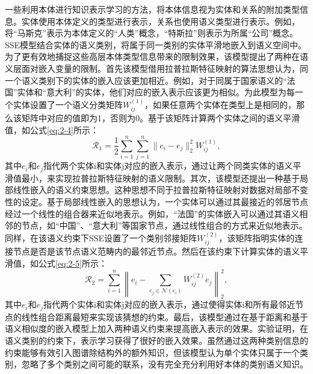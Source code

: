 一些利用本体进行知识表示学习的方法，将本体信息视为实体和关系的附加类型信息。实体使用本体定义的类型进行表示，关系也使用语义类型进行表示。例如，将“马斯克”表示为本体定义的“人类”概念，“特斯拉”则表示为所属“公司”概念。SSE\cite{guo2016sse}模型结合实体的语义类别，将属于同一类别的实体平滑地嵌入到语义空间中。为了更有效地捕捉这些高层本体类型信息带来的限制效果，该模型提出了两种在语义层面对嵌入变量的限制。首先该模型借用拉普拉斯特征映射的算法思想认为，同一个语义类别下的实体的嵌入应该更加相近。例如，对于同属于国家语义的“法国”实体和“意大利”的实体，他们对应的嵌入表示应该更为相似。为此模型为每一个实体设置了一个语义分类矩阵\(W^{(1)}_{ij}\)，如果任意两个实体在类型上是相同的，那么该矩阵中对应的值即为1，否则为0。基于该矩阵计算两个实体之间的语义平滑值，如公式\ref{eq:2-4}所示：
\begin{equation}
  \mathcal{R}_{1} = \frac{1}{2} \sum_{i=1}^{n} \sum_{j=1}^{n} \| e_{i} - e_{j} \|_{2}^{2}W^{(1)}_{ij}, \label{eq:2-4}
\end{equation}
其中\(e_{i}\)和\(e_{j}\)指代两个实体i和实体j对应的嵌入表示，通过让两个同类实体的语义平滑值最小，来实现拉普拉斯特征映射的语义限制。其次，该模型还提出一种基于局部线性嵌入的语义约束思想。这种思想不同于拉普拉斯特征映射对数据对局部不变性的设定。基于局部线性嵌入的思想认为，一个实体可以通过其最接近的邻居节点经过一个线性的组合器来近似地表示。例如，“法国”的实体嵌入可以通过其语义相邻的节点，如“中国”、“意大利”等国家节点，通过线性组合的方式来近似地表示。同样，在该语义约束下SSE设置了一个类别邻接矩阵\(W^{(2)}_{ij}\)，该矩阵指明实体的连接节点是否是该节点语义范畴内的最邻近节点。然后在该约束下计算实体的语义平滑值，如公式\ref{eq:2-5}所示：
\begin{equation}
  \mathcal{R}_{2} = \sum_{i=1}^{n} \left\| e_{i} - \sum_{e_{j}\in\mathcal{N}(e_{i})}W^{(2)}_{ij}e_{j} \right\|_{2}^{2}, \label{eq:2-5}
\end{equation}
其中\(e_{i}\)和\(e_{j}\)指代两个实体i和实体j对应的嵌入表示，通过使得实体i和所有最邻近节点的线性组合距离最短来实现该猜想的约束。最后，该模型通过在基于距离和基于语义相似度的嵌入模型上加入两种语义约束来提高嵌入表示的效果。实验证明，在语义类别的约束下，表示学习获得了很好的嵌入效果。虽然通过这两种类别信息的约束能够有效引入图谱除结构外的额外知识，但该模型认为单个实体只属于一个类别，忽略了多个类别之间可能的联系，没有完全充分利用好本体的类别语义知识。


